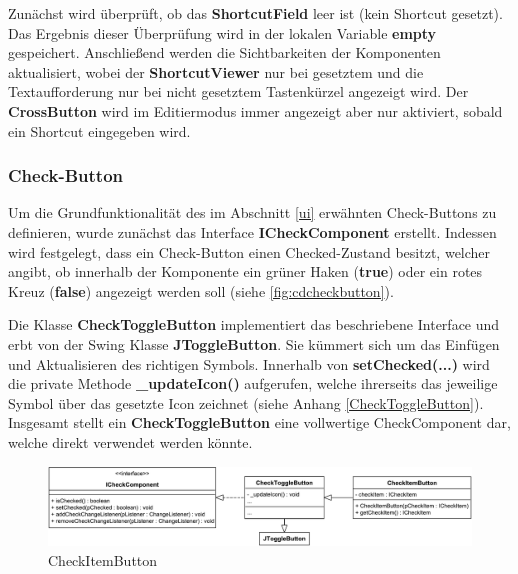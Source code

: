 \vspace{20px}



Zunächst wird überprüft, ob das \textbf{ShortcutField} leer ist (kein Shortcut gesetzt). Das Ergebnis dieser Überprüfung wird in der lokalen Variable \textbf{empty} gespeichert. Anschließend werden die Sichtbarkeiten der Komponenten aktualisiert, wobei der \textbf{ShortcutViewer} nur bei gesetztem und die Textaufforderung nur bei nicht gesetztem Tastenkürzel angezeigt wird. Der \textbf{CrossButton} wird im Editiermodus immer angezeigt aber nur aktiviert, sobald ein Shortcut eingegeben wird.

\newpage

\subsubsection{Check-Button}

\vspace{-3px}

Um die Grundfunktionalität des im Abschnitt \ref{ui} erwähnten Check-Buttons zu definieren, wurde zunächst das Interface \textbf{ICheckComponent} erstellt. Indessen wird festgelegt, dass ein Check-Button einen Checked-Zustand besitzt, welcher angibt, ob innerhalb der Komponente ein grüner Haken (\textbf{true}) oder ein rotes Kreuz (\textbf{false}) angezeigt werden soll (siehe \autoref{fig:cdcheckbutton}).

Die Klasse \textbf{CheckToggleButton} implementiert das beschriebene Interface und erbt von der Swing Klasse \textbf{JToggleButton}. Sie kümmert sich um das Einfügen und Aktualisieren des richtigen Symbols. Innerhalb von \textbf{setChecked(...)} wird die private Methode \textbf{\_updateIcon()} aufgerufen, welche ihrerseits das jeweilige Symbol über das gesetzte Icon zeichnet (siehe Anhang \ref{CheckToggleButton}). Insgesamt stellt ein \textbf{CheckToggleButton} eine vollwertige CheckComponent dar, welche direkt verwendet werden könnte.

\begin{figure}[H]
	\centering
	\includegraphics[width=1\linewidth]{../graphic/diagrams/CD_CheckButton/CD_CheckButton}
	\caption{CheckItemButton}
	\label{fig:cdcheckbutton}
\end{figure}

